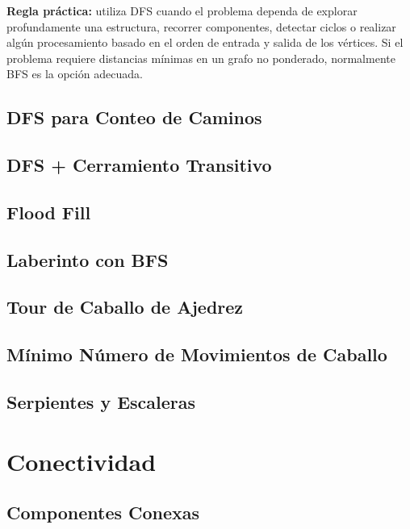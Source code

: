 \documentclass[10pt,a4paper,twocolumn]{article}
\begin{document}
\textbf{Regla práctica:} utiliza DFS cuando el problema dependa de
explorar profundamente una estructura, recorrer componentes, detectar
ciclos o realizar algún procesamiento basado en el orden de entrada y
salida de los vértices. Si el problema requiere distancias mínimas en
un grafo no ponderado, normalmente BFS es la opción adecuada.

\subsection{DFS para Conteo de Caminos}

\subsection{DFS + Cerramiento Transitivo}

\subsection{Flood Fill}

\subsection{Laberinto con BFS}

\subsection{Tour de Caballo de Ajedrez}

\subsection{Mínimo Número de Movimientos de Caballo}

\subsection{Serpientes y Escaleras}



\section{Conectividad}

\subsection{Componentes Conexas}
\end{document}
